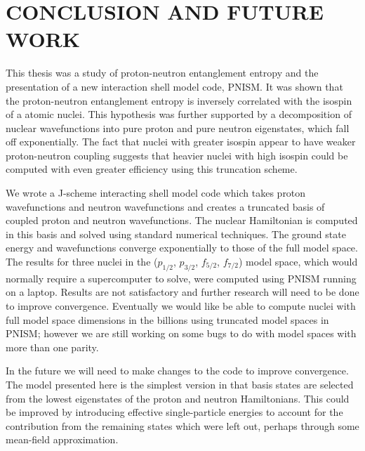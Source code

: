 \chapter{CONCLUSION AND FUTURE WORK}
\label{chap:conclusion}

This thesis was a study of proton-neutron entanglement entropy and the 
presentation of a new interaction shell model code, PNISM. It was shown 
that the proton-neutron entanglement entropy is inversely correlated
with the isospin of a atomic nuclei. 
This hypothesis was further supported by a decomposition of nuclear 
wavefunctions into pure proton and pure neutron eigenstates, which 
fall off exponentially. The fact that nuclei with greater isospin
appear to have weaker proton-neutron coupling suggests that heavier
nuclei with high isospin could be computed with even greater efficiency 
using this truncation scheme. 

We wrote a J-scheme interacting shell model code which takes proton wavefunctions
and neutron wavefunctions and creates a truncated basis of coupled proton
and neutron wavefunctions. The nuclear Hamiltonian is computed in this basis
and solved using standard numerical techniques. The ground state energy 
and wavefunctions converge exponentially to those of the full model space.
The results for three nuclei in the ($p_{1/2}$, $p_{3/2}$, $f_{5/2}$, $f_{7/2}$) model space, which would normally 
require a supercomputer to solve, were computed using PNISM running on 
a laptop. Results are not satisfactory and further research will need to be done to 
improve convergence. Eventually we would like be able to compute nuclei with full model
space dimensions in the billions using truncated model spaces in 
PNISM; however we are still working on some bugs to do with 
model spaces with more than one parity. 

In the future we will need to make changes to the code to improve convergence.
The model presented here is the simplest version in that basis states are
selected from the lowest eigenstates of the proton and neutron Hamiltonians.
This could be improved by introducing effective single-particle energies
to account for the contribution from the remaining states which were left out,
perhaps through some mean-field approximation.

